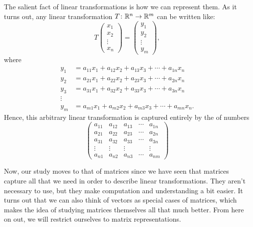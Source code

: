         The salient fact of linear transformations is how we can represent them.  As it turns out, any linear transformation $T\colon \mathbb{R}^n \to \mathbb{R}^m$ can be written like:
        \[
        T\begin{pmatrix} x_1 \\ x_2 \\ \vdots \\ x_n \end{pmatrix}
        = \begin{pmatrix} y_1 \\ y_2 \\ \vdots \\ y_m \end{pmatrix},
        \]
        where 
        \begin{align*}
            y_1 &= a_{11} x_1 + a_{12} x_2 + a_{13} x_3 + \cdots + a_{1n} x_n\\
            y_2 &= a_{21} x_1 + a_{22} x_2 + a_{23} x_3 + \cdots + a_{2n} x_n\\
            y_3 &= a_{31} x_1 + a_{32} x_2 + a_{33} x_3 + \cdots + a_{3n} x_n\\
            \vdots\\
            y_m &= a_{m1} x_1 + a_{m2} x_2 + a_{m3} x_3 + \cdots + a_{mn} x_n.
        \end{align*}
        Hence, this arbitrary linear transformation is captured entirely by the  of numbers
        \[
        \begin{pmatrix}
        a_{11} & a_{12} & a_{13} & \cdots & a_{1n}\\
        a_{21} & a_{22} & a_{23} & \cdots & a_{2n}\\
        a_{31} & a_{32} & a_{33} & \cdots & a_{3n}\\
        \vdots & \vdots & \vdots & & \vdots \\
        a_{n1} & a_{n2} & a_{n3} & \cdots & a_{nm}
        \end{pmatrix}
        \]
        
        Now, our study moves to that of matrices since we have seen that matrices capture all that we need in order to describe linear transformations.  They aren't necessary to use, but they make computation and understanding a bit easier.  It turns out that we can also think of vectors as special cases of matrices, which makes the idea of studying matrices themselves all that much better. From here on out, we will restrict ourselves to matrix representations.  
        
